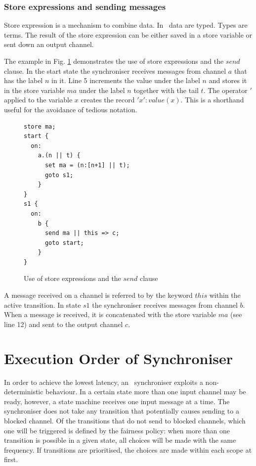   \subsubsection*{Store expressions and sending messages}
Store expression is a mechanism to combine data. In \ak\, data are typed. Types are  terms. The result of the store expression can be either saved in a store variable or sent down an output channel.

The example in Fig. \ref{sync_send} demonstrates the use of store expressions and the $send$ clause. In the start state the synchroniser receives messages from channel $a$ that has the label $n$ in it. Line 5 increments the value under the label $n$ and stores it in the store variable $ma$ under the label $n$ together with the tail $t$. The operator $'$ applied to the variable $x$ creates the record $'x': value(x)$. This is a shorthand useful for the avoidance of tedious notation.

\begin{figure}[h!]
\lstset{numbers=left, numberstyle=\small, stepnumber=1, numbersep=8pt}
\begin{lstlisting}[frame=single]
store ma;
start {
  on:
    a.(n || t) {
      set ma = (n:[n+1] || t);
      goto s1;
    }
}
s1 {
  on:
    b {
      send ma || this => c;
      goto start;
    }
}
\end{lstlisting}
\caption{Use of store expressions and the $send$ clause}
\label{sync_send}
\end{figure}

A message received on a channel is referred to by the keyword $this$ within the active transition. In state $s1$ the synchroniser receives messages from channel $b$. When a message is received, it is concatenated with the store variable $ma$ (see line 12) and sent to the output channel $c$.


\section{Execution Order of Synchroniser\label{execod}}
In order to achieve the lowest latency, an \ak\ synchroniser exploits a non-deterministic behaviour. In a certain state more than one input channel may be ready, however, a state machine receives one input message at a time. The synchroniser does not take any transition that potentially causes sending to a blocked channel. Of the transitions that do not send to blocked channels, which one will be triggered is defined by the fairness policy: when more than one transition is possible in a given state, all choices will be made with the same frequency. If transitions are prioritised, the choices are made within each scope at first.

